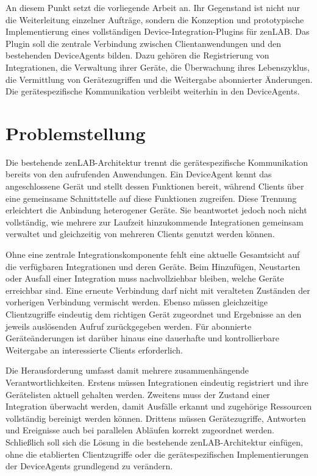 An diesem Punkt setzt die vorliegende Arbeit an. Ihr Gegenstand ist nicht nur die Weiterleitung einzelner Aufträge, sondern die Konzeption und prototypische Implementierung eines vollständigen Device-Integration-Plugins für zenLAB. Das Plugin soll die zentrale Verbindung zwischen Clientanwendungen und den bestehenden DeviceAgents bilden. Dazu gehören die Registrierung von Integrationen, die Verwaltung ihrer Geräte, die Überwachung ihres Lebenszyklus, die Vermittlung von Gerätezugriffen und die Weitergabe abonnierter Änderungen. Die gerätespezifische Kommunikation verbleibt weiterhin in den DeviceAgents.

\section{Problemstellung}

Die bestehende zenLAB-Architektur trennt die gerätespezifische Kommunikation bereits von den aufrufenden Anwendungen. Ein DeviceAgent kennt das angeschlossene Gerät und stellt dessen Funktionen bereit, während Clients über eine gemeinsame Schnittstelle auf diese Funktionen zugreifen. Diese Trennung erleichtert die Anbindung heterogener Geräte. Sie beantwortet jedoch noch nicht vollständig, wie mehrere zur Laufzeit hinzukommende Integrationen gemeinsam verwaltet und gleichzeitig von mehreren Clients genutzt werden können.

Ohne eine zentrale Integrationskomponente fehlt eine aktuelle Gesamtsicht auf die verfügbaren Integrationen und deren Geräte. Beim Hinzufügen, Neustarten oder Ausfall einer Integration muss nachvollziehbar bleiben, welche Geräte erreichbar sind. Eine erneute Verbindung darf nicht mit veralteten Zuständen der vorherigen Verbindung vermischt werden. Ebenso müssen gleichzeitige Clientzugriffe eindeutig dem richtigen Gerät zugeordnet und Ergebnisse an den jeweils auslösenden Aufruf zurückgegeben werden. Für abonnierte Geräteänderungen ist darüber hinaus eine dauerhafte und kontrollierbare Weitergabe an interessierte Clients erforderlich.

Die Herausforderung umfasst damit mehrere zusammenhängende Verantwortlichkeiten. Erstens müssen Integrationen eindeutig registriert und ihre Gerätelisten aktuell gehalten werden. Zweitens muss der Zustand einer Integration überwacht werden, damit Ausfälle erkannt und zugehörige Ressourcen vollständig bereinigt werden können. Drittens müssen Gerätezugriffe, Antworten und Ereignisse auch bei parallelen Abläufen korrekt zugeordnet werden. Schließlich soll sich die Lösung in die bestehende zenLAB-Architektur einfügen, ohne die etablierten Clientzugriffe oder die gerätespezifischen Implementierungen der DeviceAgents grundlegend zu verändern.

